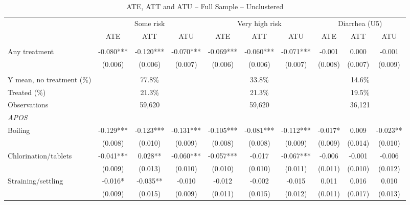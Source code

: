 \documentclass[10pt]{article}
\begin{document}
\clearpage
\begin{table}[H]
\centering
\caption{ATE, ATT and ATU -- Full Sample -- Unclustered}
\label{tab:ate-att-atu-iid-aggregated}
\scriptsize
\setlength{\tabcolsep}{4pt}
\renewcommand{\arraystretch}{0.92}
\begin{adjustbox}{max width=\linewidth}
\begin{tabular}{lccccccccc}
\hline\hline
 & \multicolumn{3}{c}{Some risk} & \multicolumn{3}{c}{Very high risk} & \multicolumn{3}{c}{Diarrhea (U5)} \\
\cmidrule(lr){2-4}\cmidrule(lr){5-7}\cmidrule(lr){8-10}
 & ATE & ATT & ATU & ATE & ATT & ATU & ATE & ATT & ATU \\
\addlinespace[3pt]
\multicolumn{10}{l}{\textit{IRM}} \\
Any treatment & -0.080*** & -0.120*** & -0.070*** & -0.069*** & -0.060*** & -0.071*** & -0.001 & 0.000 & -0.001 \\
 & (0.006) & (0.006) & (0.007) & (0.006) & (0.006) & (0.007) & (0.008) & (0.007) & (0.009) \\
\addlinespace[6pt]
\multicolumn{10}{l}{\textit{Descriptive statistics and sample}} \\
Y mean, no treatment (\%) & \multicolumn{3}{c}{77.8\%} & \multicolumn{3}{c}{33.8\%} & \multicolumn{3}{c}{14.6\%} \\
Treated (\%) & \multicolumn{3}{c}{21.3\%} & \multicolumn{3}{c}{21.3\%} & \multicolumn{3}{c}{19.5\%} \\
Observations & \multicolumn{3}{c}{59,620} & \multicolumn{3}{c}{59,620} & \multicolumn{3}{c}{36,121} \\
\midrule
\multicolumn{10}{l}{\textit{APOS}} \\
Boiling & -0.129*** & -0.123*** & -0.131*** & -0.105*** & -0.081*** & -0.112*** & -0.017* & 0.009 & -0.023** \\
 & (0.008) & (0.010) & (0.009) & (0.008) & (0.008) & (0.009) & (0.009) & (0.014) & (0.010) \\
Chlorination/tablets & -0.041*** & 0.028** & -0.060*** & -0.057*** & -0.017 & -0.067*** & -0.006 & -0.001 & -0.006 \\
 & (0.009) & (0.013) & (0.010) & (0.010) & (0.010) & (0.011) & (0.011) & (0.010) & (0.012) \\
Straining/settling & -0.016* & -0.035** & -0.010 & -0.012 & -0.002 & -0.015 & 0.011 & 0.016 & 0.010 \\
 & (0.009) & (0.015) & (0.009) & (0.011) & (0.015) & (0.012) & (0.011) & (0.017) & (0.013) \\

\end{tabular}
\end{adjustbox}
\end{table}
\end{document}
